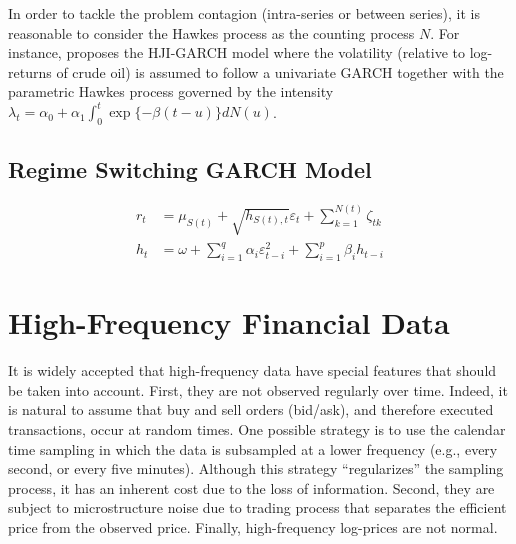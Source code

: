 \documentclass[11pt]{article}
\begin{document}
In order to tackle the problem contagion (intra-series or between series), it is reasonable to consider the Hawkes process as the counting process \(N\). For instance, \cite{zhang-2024} proposes the HJI-GARCH model where the volatility (relative to  log-returns of crude oil) is assumed to follow a univariate GARCH together with the parametric Hawkes process governed by the intensity \(\lambda_t=\alpha_0+\alpha_1\int_0^t\exp\{-\beta(t-u)\}dN(u)\).

\subsection{Regime Switching GARCH Model}

\begin{equation*}
\begin{split}
r_t&=\mu_{S(t)}+\sqrt{h_{S(t),t}}\varepsilon_t+\sum_{k=1}^{N(t)}\zeta_{tk}\\
h_t&=\omega+\sum_{i=1}^q\alpha_i\varepsilon_{t-i}^2+\sum_{i=1}^p\beta_ih_{t-i}
\end{split}
\end{equation*}


\section{High-Frequency Financial Data}

It is widely accepted that high-frequency data have special features that should be taken into account. First, they are not observed regularly over time. Indeed, it is natural to assume that buy and sell orders (bid/ask), and therefore executed transactions, occur at random times. One possible strategy is to use the calendar time sampling in which the data is subsampled at a lower frequency (e.g., every second, or every five minutes). Although this strategy ``regularizes'' the sampling process, it has an inherent cost due to the loss of information. Second, they are subject to microstructure noise due to trading process that separates the efficient price from the observed price. Finally, high-frequency log-prices are not normal.
\end{document}
